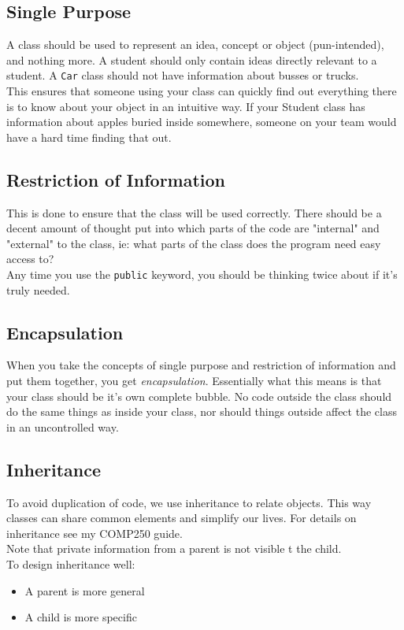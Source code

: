 \documentclass[12pt]{article}
\theoremstyle{definition}
\begin{document}
\subsection{Single Purpose}
A class should be used to represent an idea, concept or object (pun-intended), and nothing more. A student should only contain ideas directly relevant to a student. A \texttt{Car} class should not have information about busses or trucks.
\\ \linebreak
This ensures that someone using your class can quickly find out everything there is to know about your object in an intuitive way. If your Student class has information about apples buried inside somewhere, someone on your team would have a hard time finding that out.
\subsection{Restriction of Information}
This is done to ensure that the class will be used correctly. There should be a decent amount of thought put into which parts of the code are "internal" and "external" to the class, ie: what parts of the class does the program need easy access to?
\\ \linebreak
Any time you use the \texttt{public} keyword, you should be thinking twice about if it's truly needed.
\subsection{Encapsulation}
When you take the concepts of single purpose and restriction of information and put them together, you get \textit{encapsulation}. Essentially what this means is that your class should be it's own complete bubble. No code outside the class should do the same things as inside your class, nor should things outside affect the class in an uncontrolled way.
\subsection{Inheritance}
To avoid duplication of code, we use inheritance to relate objects. This way classes can share common elements and simplify our lives. For details on inheritance see my COMP250 guide.
\\ \linebreak
Note that private information from a parent is not visible t the child.
\\ \linebreak
To design inheritance well:
\begin{itemize}
	\item A parent is more general
	\item A child is more specific
\end{itemize}
\end{document}
